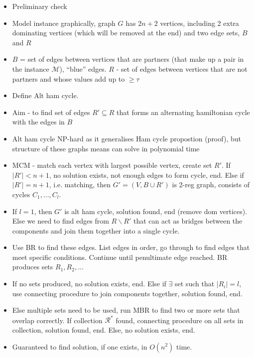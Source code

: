 \documentclass{elsarticle}
\begin{document}
\begin{itemize}
	\item Preliminary check
	\item Model instance graphically, graph $G$ has $2n+2$ vertices, including 2 extra dominating vertices (which will be removed at the end) and two edge sets, $B$ and $R$
	\item $B$ = set of edges between vertices that are partners (that make up a pair in the instance $\mathcal{M}$), ``blue'' edges. $R$ - set of edges between vertices that are not partners and whose values add up to $\geq \tau$
	\item Define Alt ham cycle.
	\item Aim - to find set of edges $R' \subseteq R$ that forms an alternating hamiltonian cycle with the edges in $B$
	\item Alt ham cycle NP-hard as it generalises Ham cycle propostion (proof), but structure of these graphs means can solve in polynomial time
	\item MCM - match each vertex with largest possible vertex, create set $R'$. If $|R'| < n+1$, no solution exists, not enough edges to form cycle, end. Else if $|R'| = n+1$, i.e. matching, then $G' = (V, B \cup R')$ is 2-reg graph, consists of cycles $C_1,...,C_l$.
	\item If $l = 1$, then $G'$ is alt ham cycle, solution found, end (remove dom vertices). Else we need to find edges from $R\backslash R'$ that can act as bridges between the components and join them together into a single cycle. 
	\item Use BR to find these edges. List edges in order, go through to find edges that meet specific conditions. Continue until penultimate edge reached. BR produces sets $R_1, R_2,...$
	\item If no sets produced, no solution exists, end. Else if $\exists$ set such that $|R_i| = l$, use connecting procedure to join components together, solution found, end.
	\item Else multiple sets need to be used, run MBR to find two or more sets that overlap correctly. If collection $\mathcal{R}^*$ found, connecting procedure on all sets in collection, solution found, end. Else, no solution exists, end.
	\item Guaranteed to find solution, if one exists, in $O(n^2)$ time.
\end{itemize}
\end{document}

